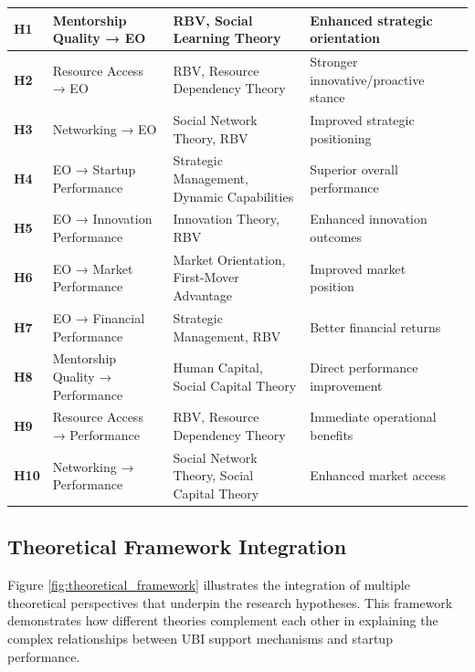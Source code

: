 \documentclass[../Main.tex]{subfiles}
\begin{document}
\begin{table}[H]
\begin{longtable}{|p{1.5cm}|p{3cm}|p{4cm}|p{3cm}|p{2.5cm}|}
            \textbf{H1} & Mentorship Quality → EO & RBV, Social Learning Theory & Enhanced strategic orientation & \cite{bandura1997self, zhao2005developing} \\
            \hline
            \textbf{H2} & Resource Access → EO & RBV, Resource Dependency Theory & Stronger innovative/proactive stance & \cite{wiklund2005entrepreneurial, bruton2010governance} \\
            \hline
            \textbf{H3} & Networking → EO & Social Network Theory, RBV & Improved strategic positioning & \cite{stam2008entrepreneurial, batjargal2003social} \\
            \hline
            \textbf{H4} & EO → Startup Performance & Strategic Management, Dynamic Capabilities & Superior overall performance & \cite{rauch2009entrepreneurial, saeed2014entrepreneurial} \\
            \hline
            \textbf{H5} & EO → Innovation Performance & Innovation Theory, RBV & Enhanced innovation outcomes & \cite{lumpkin1996clarifying, wiklund2003knowledge} \\
            \hline
            \textbf{H6} & EO → Market Performance & Market Orientation, First-Mover Advantage & Improved market position & \cite{lumpkin2001linking, wiklund2005entrepreneurial} \\
            \hline
            \textbf{H7} & EO → Financial Performance & Strategic Management, RBV & Better financial returns & \cite{rauch2009entrepreneurial, wales2013entrepreneurial} \\
            \hline
            \textbf{H8} & Mentorship Quality → Performance & Human Capital, Social Capital Theory & Direct performance improvement & \cite{stjean2012mentoring, sullivan2011effectiveness} \\
            \hline
            \textbf{H9} & Resource Access → Performance & RBV, Resource Dependency Theory & Immediate operational benefits & \cite{cooper1994initial, bruton2010governance} \\
            \hline
            \textbf{H10} & Networking → Performance & Social Network Theory, Social Capital Theory & Enhanced market access & \cite{stam2008entrepreneurial, batjargal2003social} \\
            \hline
        \end{longtable}
    \end{table}

    \subsection{Theoretical Framework Integration}
    Figure \ref{fig:theoretical_framework} illustrates the integration of multiple theoretical perspectives that underpin the research hypotheses. This framework demonstrates how different theories complement each other in explaining the complex relationships between UBI support mechanisms and startup performance.
\end{document}
